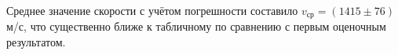 \documentclass[12pt, a4paper]{article}
\begin{document}
Среднее значение скорости с учётом погрешности составило $v_{\text{ср}} = (1415 \pm 76)$ м/с, что существенно ближе к табличному по сравнению с первым оценочным результатом.






















\end{document}
